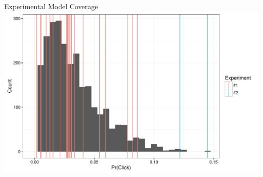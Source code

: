 \documentclass[11pt,xcolor=svgnames]{beamer}
\begin{document}
\begin{frame}
Experimental Model Coverage
\includegraphics[width=\textwidth]{hist.pdf}
\end{frame}
\end{document}
